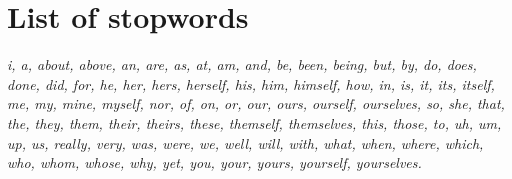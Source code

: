 %
%
%
%
%


\section{List of stopwords}
\small 
\textit{i, a, about, above, an, are, as, at, am, and, be, been, being, but, by, do, does, done, did, for, he, her, hers, herself, his, him, himself, how, in, is, it, its, itself, me, my, mine, myself, nor, of, on, or, our, ours, ourself, ourselves, so, she, that, the, they, them, their, theirs, these, themself, themselves, this, those, to, uh, um, up, us, really, very, was, were, we, well, will, with, what, when, where, which, who, whom, whose, why, yet, you, your, yours, yourself, yourselves.
}
\normalsize
